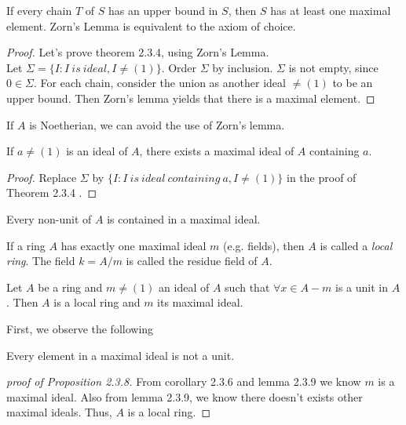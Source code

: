 \documentclass[11pt,fleqn]{book} %
\begin{document}
\begin{CJK}{UTF8}{gkai}
\begin{lemma}
	[Zorn] If every chain $T$ of $S$ has an upper bound in $S$, then $S$ has at least one maximal element. Zorn's Lemma is equivalent to the axiom of choice.
\end{lemma}

\begin{proof}
	Let's prove theorem 2.3.4, using Zorn's Lemma. \\
	Let $\Sigma = \{I : I \ is \ ideal, I \neq (1)\}$. Order $\Sigma$ by inclusion. $\Sigma$ is not empty, since $0 \in \Sigma$. For each chain, consider the union as another ideal $\neq (1)$ to be an upper bound. Then Zorn's lemma yields that there is a maximal element.
\end{proof}
\begin{remark}
	If $A$ is Noetherian, we can avoid the use of Zorn's lemma.	
\end{remark}

\begin{corollary}
	If $a \neq (1)$ is an ideal of $A$, there exists a maximal ideal of $A$ containing $a$.
\end{corollary}
\begin{proof}
	Replace $\Sigma$ by $\{I: I \ is \ ideal \ containing \ a, I \neq (1)\}$ in the proof of Theorem 2.3.4 .
\end{proof}

\begin{corollary}
	Every non-unit of $A$ is contained in a maximal ideal.
\end{corollary}

\begin{definition}
	 If a ring $A$ has exactly one maximal ideal $m$ (e.g. fields), then $A$ is called a {\it local ring}. The field $k = A/m$ is called the residue field of $A$.
\end{definition}

\begin{proposition}
	Let $A$ be a ring and $m \neq (1)$ an ideal of $A$ such that $\forall x \in A - m$ is a unit in $A$. Then $A$ is a local ring and $m$ its maximal ideal.
\end{proposition}

First, we observe the following
\begin{lemma}
	Every element in a maximal ideal is not a unit.
\end{lemma}

\begin{proof}[proof of Proposition 2.3.8]
	From corollary 2.3.6 and lemma 2.3.9 we know $m$ is a maximal ideal. Also from lemma 2.3.9, we know there doesn't exists other maximal ideals. Thus, $A$ is a local ring.
\end{proof}


\end{CJK}
\end{document}
